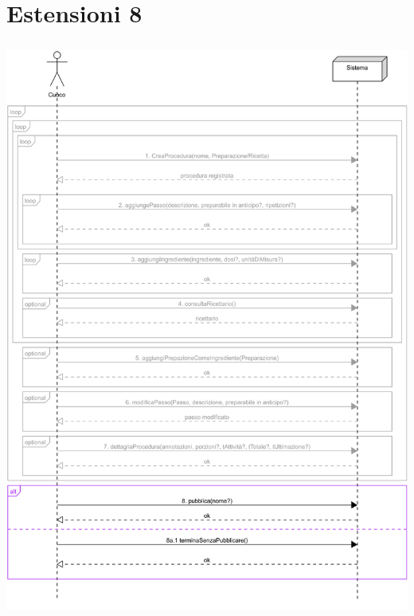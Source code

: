 \section*{Estensioni 8}
\begin{center}
  \includegraphics[max width=\textwidth, max height=190mm]{../resources/img/GRP/SSD/ext8.png}
\end{center}
